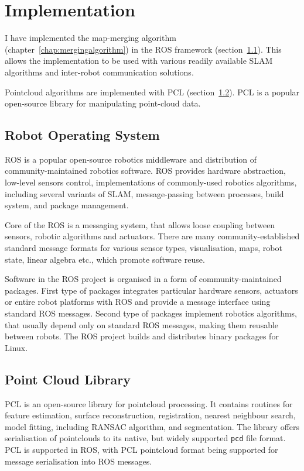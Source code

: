 \chapter{Implementation}
\label{chap:implementation}

I have implemented the map-merging algorithm (chapter~\ref{chap:mergingalgorithm}) in the \gls{ROS} framework (section~\ref{sec:ros}). This allows the implementation to be used with various readily available \gls{SLAM} algorithms and inter-robot communication solutions.

Pointcloud algorithms are implemented with \gls{PCL} (section~\ref{sec:pcl}). \gls{PCL} is a popular open-source library for manipulating point-cloud data.

\section{Robot Operating System}
\label{sec:ros}

\gls{ROS} is a popular open-source robotics middleware and distribution of community-maintained robotics software. \gls{ROS} provides hardware abstraction, low-level sensors control, implementations of commonly-used robotics algorithms, including several variants of \gls{SLAM}, message-passing between processes, build system, and package management.

Core of the \gls{ROS} is a messaging system, that allows loose coupling between sensors, robotic algorithms and actuators. There are many community-established standard message formats for various sensor types, visualisation, maps, robot state, linear algebra etc., which promote software reuse.

Software in the \gls{ROS} project is organised in a form of community-maintained packages. First type of packages integrates particular hardware sensors, actuators or entire robot platforms with \gls{ROS} and provide a message interface using standard \gls{ROS} messages. Second type of packages implement robotics algorithms, that usually depend only on standard \gls{ROS} messages, making them reusable between robots. The \gls{ROS} project builds and distributes binary packages for Linux.

\section{Point Cloud Library}
\label{sec:pcl}

\gls{PCL} is an open-source library for pointcloud processing. It contains routines for feature estimation, surface reconstruction, registration, nearest neighbour search, model fitting, including \gls{RANSAC} algorithm, and segmentation. The library offers serialisation of pointclouds to its native, but widely supported \texttt{pcd} file format. \Gls{PCL} is supported in \gls{ROS}, with \gls{PCL} pointcloud format being supported for message serialisation into \gls{ROS} messages.

